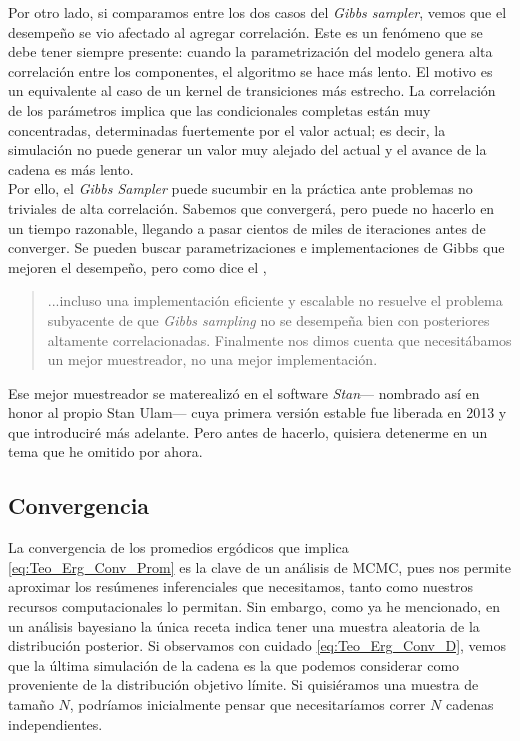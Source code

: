 Por otro lado, si comparamos entre los dos casos del \textit{Gibbs sampler}, vemos que el desempeño se vio afectado al agregar correlación. Este es un fenómeno que se debe tener siempre presente: cuando la parametrización del modelo genera alta correlación entre los componentes, el algoritmo se hace más lento. El motivo es un equivalente al caso de un kernel de transiciones más estrecho. La correlación de los parámetros implica que las condicionales completas están muy concentradas, determinadas fuertemente por el valor actual; es decir, la simulación no puede generar un valor muy alejado del actual y el avance de la cadena es más lento.\\ 

Por ello, el \textit{Gibbs Sampler} puede sucumbir en la práctica ante problemas no triviales de alta correlación. Sabemos que convergerá, pero puede no hacerlo en un tiempo razonable, llegando a pasar cientos de miles de iteraciones antes de converger. Se pueden buscar parametrizaciones e implementaciones de Gibbs que mejoren el desempeño, pero como dice el \textcite{Stan17}, 
\begin{quote}
...incluso una implementación eficiente y escalable no resuelve el problema subyacente de que \textit{Gibbs sampling} no se desempeña bien con posteriores altamente correlacionadas. Finalmente nos dimos cuenta que necesitábamos un mejor muestreador, no una mejor implementación.
\end{quote}

Ese mejor muestreador se materealizó en el software \textit{Stan}--- nombrado así en honor al propio Stan Ulam--- cuya primera versión estable fue liberada en 2013 y que introduciré más adelante. Pero antes de hacerlo, quisiera detenerme en un tema que he omitido por ahora.\\

\subsection{Convergencia}

La convergencia de los promedios ergódicos que implica \eqref{eq:Teo_Erg_Conv_Prom} es la clave de un análisis de MCMC, pues nos permite aproximar los resúmenes inferenciales que necesitamos, tanto como nuestros recursos computacionales lo permitan. Sin embargo, como ya he mencionado, en un análisis bayesiano la única receta indica tener una muestra aleatoria de la distribución posterior. Si observamos con cuidado \eqref{eq:Teo_Erg_Conv_D}, vemos que la última simulación de la cadena es la que podemos considerar como proveniente de la distribución objetivo límite. Si quisiéramos una muestra de tamaño $N$, podríamos inicialmente pensar que necesitaríamos correr $N$ cadenas independientes.\\ 

